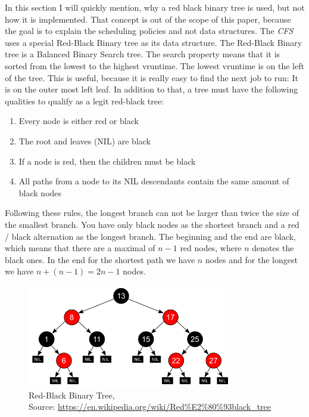 In this section I will quickly mention, why a red black binary tree is used, but not how it is implemented.
That concept is out of the scope of this paper, because the goal is to explain the scheduling policies and not data structures.
The \emph{CFS} uses a special Red-Black Binary tree as its data structure.
The Red-Black Binary tree is a Balanced Binary Search tree.
The search property means that it is sorted from the lowest to the highest vruntime.
The lowest vruntime is on the left of the tree.
This is useful, because it is really easy to find the next job to run: It is on the outer most left leaf.
In addition to that, a tree must have the following qualities to qualify as a legit red-black tree:
\begin{enumerate}
  \item Every node is either red or black
  \item The root and leaves (NIL) are black
  \item If a node is red, then the children must be black
  \item All paths from a node to its NIL descendants contain the same amount of black nodes
\end{enumerate}
Following these rules, the longest branch can not be larger than twice the size of the smallest branch.
You have only black nodes as the shortest branch and a red / black alternation as the longest branch.
The beginning and the end are black, which means that there are a maximal of $n-1$ red nodes, where $n$ denotes the black ones.
In the end for the shortest path we have $n$ nodes and for the longest we have $n + (n-1) = 2n-1$ nodes.

\begin{figure}[h]
    \centering
    \includegraphics[width=0.8\textwidth]{Assets/Red-Black-Tree.png}
    \caption{Red-Black Binary Tree, \\Source: \url{https://en.wikipedia.org/wiki/Red\%E2\%80\%93black_tree}}
    \label{fig:stride-scheduling}
\end{figure}


